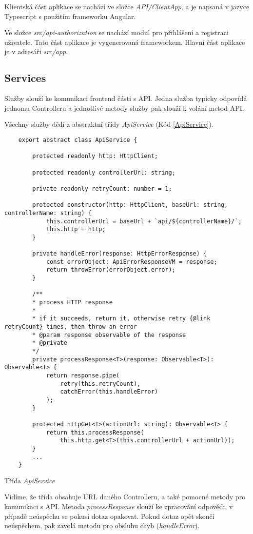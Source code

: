 Klientská část aplikace se nachází ve složce \textit{API/ClientApp}, a je napsaná v jazyce Typescript s použitím frameworku Angular. 

Ve složce \textit{src/api-authorization} se nachází modul pro přihlášení a registraci uživatele. Tato část aplikace je vygenerovaná frameworkem. Hlavní část aplikace je v adresáři \textit{src/app}.

\subsection{Services}

Služby slouží ke komunikaci frontend části s API. Jedna služba typicky odpovídá jednomu Controlleru a jednotlivé metody služby pak slouží k volání metod API. 

Všechny služby dědí z abstraktní třídy \textit{ApiService} (Kód \ref{ApiService}). 

\begin{program}
	\begin{lstlisting}
	export abstract class ApiService {
	
		protected readonly http: HttpClient;
		
		protected readonly controllerUrl: string;
		
		private readonly retryCount: number = 1;
		
		protected constructor(http: HttpClient, baseUrl: string, controllerName: string) {
			this.controllerUrl = baseUrl + `api/${controllerName}/`;
			this.http = http;
		}
		
		private handleError(response: HttpErrorResponse) {
			const errorObject: ApiErrorResponseVM = response;
			return throwError(errorObject.error);
		}
		
		/**
		* process HTTP response
		*
		* if it succeeds, return it, otherwise retry {@link retryCount}-times, then throw an error
		* @param response observable of the response
		* @private
		*/
		private processResponse<T>(response: Observable<T>): Observable<T> {
			return response.pipe(
				retry(this.retryCount),
				catchError(this.handleError)
			);
		}
		
		protected httpGet<T>(actionUrl: string): Observable<T> {
			return this.processResponse(
				this.http.get<T>(this.controllerUrl + actionUrl));
		}
		...
	}
	\end{lstlisting}
	\caption{Třída \textit{ApiService}}
	\label{ApiService}
\end{program}

Vidíme, že třída obsahuje URL daného Controlleru, a také pomocné metody pro komunikaci s API. Metoda \textit{processResponse} slouží ke zpracování odpovědi, v případě neúspěchu se pokusí dotaz opakovat. Pokud dotaz opět skončí neúspěchem, pak zavolá metodu pro obsluhu chyb (\textit{handleError}).

